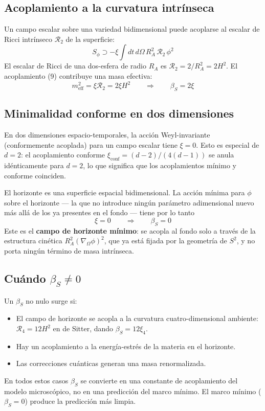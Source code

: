 \documentclass[12pt,a4paper]{article}
\begin{document}
\subsection{Acoplamiento a la curvatura intrínseca}

Un campo escalar sobre una variedad bidimensional puede acoplarse al escalar de Ricci intrínseco $\mathcal{R}_2$ de la superficie:
\begin{equation}
S_\phi \supset -\xi \int dt\, d\Omega\, R_A^2\, \mathcal{R}_2\, \phi^2 \tag{9}
\end{equation}
El escalar de Ricci de una dos-esfera de radio $R_A$ es $\mathcal{R}_2 = 2/R_A^2 = 2H^2$. El acoplamiento (9) contribuye una masa efectiva:
\begin{equation}
m_\text{eff}^2 = \xi \mathcal{R}_2 = 2\xi H^2 \qquad \Longrightarrow \qquad \beta_S = 2\xi \tag{10}
\end{equation}

\subsection{Minimalidad conforme en dos dimensiones}

En dos dimensiones espacio-temporales, la acción Weyl-invariante (conformemente acoplada) para un campo escalar tiene $\xi = 0$. Esto es especial de $d=2$: el acoplamiento conforme $\xi_\text{conf} = (d-2)/(4(d-1))$ se anula idénticamente para $d=2$, lo que significa que los acoplamientos mínimo y conforme coinciden.

El horizonte es una superficie espacial bidimensional. La acción mínima para $\phi$ sobre el horizonte --- la que no introduce ningún parámetro adimensional nuevo más allá de los ya presentes en el fondo --- tiene por lo tanto
\begin{equation}
\xi = 0 \qquad \Longrightarrow \qquad \beta_S = 0 \tag{11}
\end{equation}
Este es el \textbf{campo de horizonte mínimo}: se acopla al fondo solo a través de la estructura cinética $R_A^2(\nabla_\Omega\phi)^2$, que ya está fijada por la geometría de $S^2$, y no porta ningún término de masa intrínseca.

\subsection{Cuándo $\beta_S \neq 0$}

Un $\beta_S$ no nulo surge si:
\begin{itemize}
  \item El campo de horizonte se acopla a la curvatura cuatro-dimensional ambiente: $\mathcal{R}_4 = 12H^2$ en de Sitter, dando $\beta_S = 12\xi_4$.
  \item Hay un acoplamiento a la energía-estrés de la materia en el horizonte.
  \item Las correcciones cuánticas generan una masa renormalizada.
\end{itemize}
En todos estos casos $\beta_S$ se convierte en una constante de acoplamiento del modelo microscópico, no en una predicción del marco mínimo. El marco mínimo ($\beta_S = 0$) produce la predicción más limpia.
\end{document}

